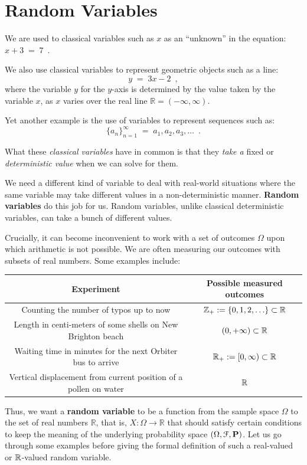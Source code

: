 \chapter{Random Variables}\label{S:RandomVariable}

We are used to classical variables such as $x$ as an ``unknown'' in
the equation: $x+3\;=\;7 \enspace$.

We also  use classical variables to represent geometric objects such as a line:
\[
y\;=\;3x-2 \enspace ,
\]
where the variable $y$ for the $y$-axis is determined by the value taken
by the variable $x$, as $x$ varies over the real line $\mathbb{R} =
(-\infty,\infty)$.

Yet another example is the use  of variables  to represent sequences such as:
\[
\{a_n\}_{n=1}^{\infty}\; = \;a_1,a_2,a_3,\ldots \enspace.
\]

What these \emph{classical variables} have in common is that they \emph{take a} fixed or \emph{deterministic value} when we can solve for them.

We need a different kind of variable to deal with real-world situations where the same variable may take 
different values in a non-deterministic manner.  {\bf Random variables} do this job for us.  
Random variables, unlike classical deterministic variables, can take a bunch of different values.

Crucially, it can become inconvenient to work with a set of outcomes $\Omega$ upon which arithmetic is not possible. 
We are often measuring our outcomes with subsets of real numbers.  Some examples include:

\begin{table}[ht]
\begin{tabular}{c c} \hline
Experiment & Possible measured outcomes\\ \hline
Counting the number of typos up to now & $\mathbb{Z}_+:=\{0,1,2,\ldots\} \subset \mathbb{R}$ \\
Length in centi-meters of some shells on New Brighton beach & $(0,+\infty) \subset \mathbb{R}$ \\
Waiting time in minutes for the next Orbiter bus to arrive & $\mathbb{R}_+:=[0,\infty) \subset \mathbb{R}$\\
Vertical displacement from current position of a pollen on water & $\mathbb{R}$ \\ \hline
\end{tabular}
\end{table}

Thus, we want a \textbf{random variable} to be a function from the sample space $\Omega$ to the set of real numbers $\mathbb{R}$, that is,  $X : \Omega \to \mathbb{R}$ that should satisfy certain conditions to keep the meaning of the underlying probability space $(\Omega, \mathcal{F},\mathbf{P})$. 
Let us go through some examples before giving the formal definition of such a real-valued or $\mathbb{R}$-valued random variable.


